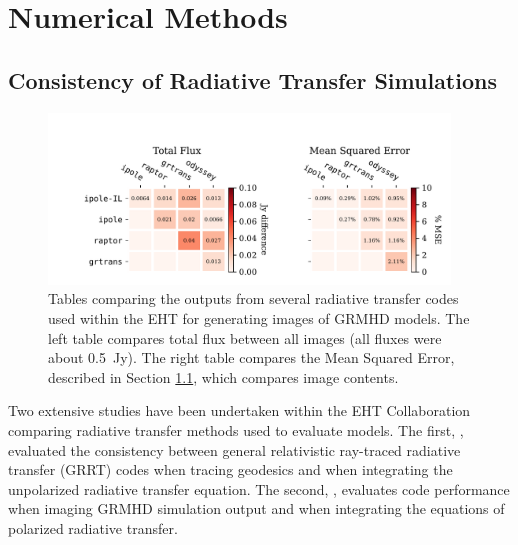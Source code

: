\section{Numerical Methods}\label{app:numerical}


\subsection{Consistency of Radiative Transfer Simulations}\label{app:radtrans}

\begin{figure}
  \centering
  \includegraphics[width=0.95\textwidth]{figures/grmhd_hi_IntegratedUnpolarizeds_plot.pdf}
  \caption{Tables comparing the outputs from several radiative transfer codes used within the EHT for generating images of GRMHD models.  The left table compares total flux between all images (all fluxes were about 0.5~Jy). The right table compares the Mean Squared Error, described in Section \ref{app:radtrans}, which compares image contents.}
  \label{fig:radtrans_grmhd_comp}
\end{figure}

Two extensive studies have been undertaken within the EHT Collaboration comparing radiative transfer methods used to evaluate models. The first, \citep{2020ApJ...897..148G}, evaluated the consistency between general relativistic ray-traced radiative transfer (GRRT) codes when tracing geodesics and when integrating the unpolarized radiative transfer equation. The second, \citet{Prather_et_al_2022}, evaluates code performance when imaging GRMHD simulation output and when integrating the equations of polarized radiative transfer.

